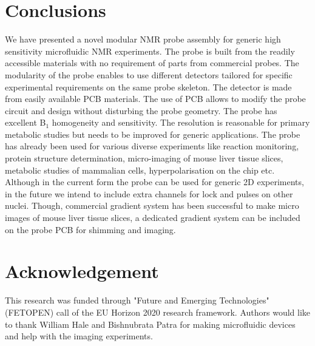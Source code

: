 \documentclass[preprint,12pt]{article}
\begin{document}
\section{Conclusions}
We have presented a novel modular NMR probe assembly for generic high sensitivity microfluidic NMR experiments. The probe is built from the readily accessible materials with no requirement of parts from commercial probes. The modularity of the probe enables to use different detectors tailored for specific experimental requirements on the same probe skeleton. The detector is made from easily available PCB materials. The use of PCB allows to modify the probe circuit and design without disturbing the probe geometry. The probe has excellent B$_1$ homogeneity and sensitivity. The resolution is reasonable for primary metabolic studies but needs to be improved for generic applications. The probe has already been used for various diverse experiments like reaction monitoring, protein structure determination, micro-imaging of mouse liver tissue slices, metabolic studies of mammalian cells, hyperpolarisation on the chip etc. Although in the current form the probe can be used for generic 2D experiments, in the future we intend to include extra channels for lock and pulses on other nuclei. Though, commercial gradient system has been successful to make micro images of mouse liver tissue slices, a dedicated gradient system can be included on the probe PCB for shimming and imaging.
\section{Acknowledgement}
This research was funded through "Future and Emerging Technologies" (FETOPEN) call of the EU Horizon 2020 research framework. Authors would like to thank William Hale and Bishnubrata Patra for making microfluidic devices and help with the imaging experiments.
\clearpage


\end{document}
